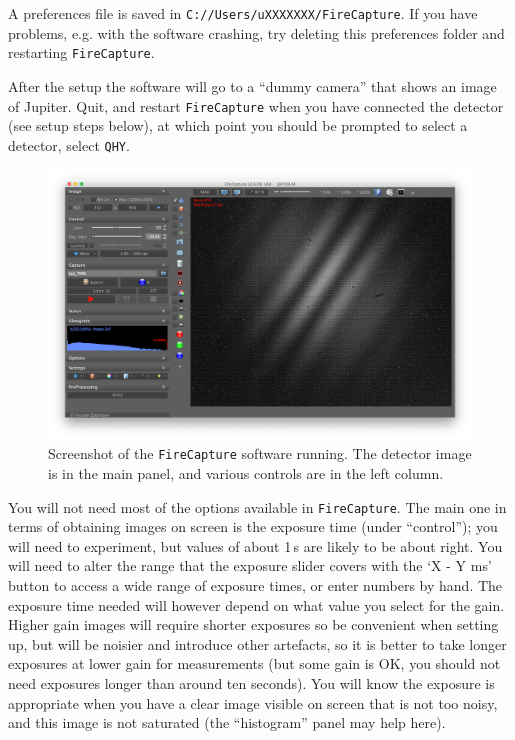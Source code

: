 \documentclass[11pt]{article}
\begin{document}
A preferences file is saved in \texttt{C://Users/uXXXXXXX/FireCapture}. If you have problems, e.g. with the software crashing, try deleting this preferences folder and restarting \texttt{FireCapture}.

After the setup the software will go to a ``dummy camera'' that shows an image of Jupiter. Quit, and restart \texttt{FireCapture} when you have connected the detector (see setup steps below), at which point you should be prompted to select a detector, select \texttt{QHY}.

\begin{figure}[h]
    \centering
    \includegraphics[width=1\textwidth]{doc/fc.png}
    \caption{Screenshot of the \texttt{FireCapture} software running. The detector image is in the main panel, and various controls are in the left column.}
    \label{fig:fc}
\end{figure}

You will not need most of the options available in \texttt{FireCapture}. The main one in terms of obtaining images on screen is the exposure time (under ``control''); you will need to experiment, but values of about 1\,s are likely to be about right. You will need to alter the range that the exposure slider covers with the `X - Y ms' button to access a wide range of exposure times, or enter numbers by hand. The exposure time needed will however depend on what value you select for the gain. Higher gain images will require shorter exposures so be convenient when setting up, but will be noisier and introduce other artefacts, so it is better to take longer exposures at lower gain for measurements (but some gain is OK, you should not need exposures longer than around ten seconds). You will know the exposure is appropriate when you have a clear image visible on screen that is not too noisy, and this image is not saturated (the ``histogram'' panel may help here).
\end{document}
